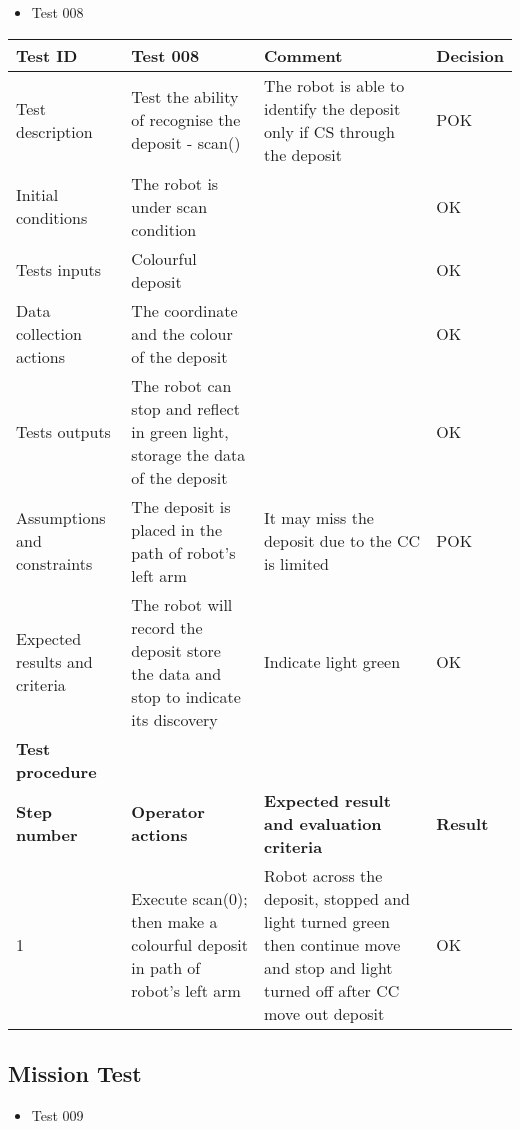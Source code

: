 \documentclass[11pt, a4paper]{article}
\begin{document}
\begin{itemize}
\item {Test 008}\\
\end{itemize}

\begin{tabular} 
	  {|p{4cm}|p{4.5cm}|p{4.5cm}|p{1.5cm}|}
\hline
\textbf{Test ID} & \textbf{Test 008} & \textbf{Comment} & \textbf{Decision}\\
\hline
{Test description} & {Test the ability of recognise the deposit - scan()} & {The robot is able to identify the deposit only if CS through the deposit} & {POK}\\
\hline
{Initial conditions} & {The robot is under scan \newline condition} & {} & {OK}\\
\hline
{Tests inputs} & {Colourful deposit} & {} & {OK}\\
\hline
{Data collection actions} & {The coordinate and the colour of the deposit} & {} & {OK}\\
\hline
{Tests outputs} & {The robot can stop and reflect in green light, storage the data of the deposit} & {} & {OK}\\
\hline
{Assumptions and constraints} & {The deposit is placed in the path of robot's left arm} & {It may miss the deposit due to the CC is limited} & {POK}\\
\hline
{Expected results and criteria} & {The robot will record the \newline deposit store the data and stop to indicate its discovery} & {Indicate light green} & {OK}\\
\hline
\textbf{Test procedure} & \textbf{} & \textbf{} & \textbf{}\\
\hline
\textbf{Step number} & \textbf{Operator actions} & \textbf{Expected result and \newline evaluation criteria} & \textbf{Result}\\
\hline
{1} & {Execute \newline scan(0); \newline then make a colourful deposit in path of robot's left arm} & {Robot across the deposit, stopped and light turned green then continue move and stop and light turned off after CC move out deposit} & {OK}\\
\hline
\end{tabular}
\newpage

\subsection{Mission Test}
\begin{itemize}
\item {Test 009}\\
\end{itemize}
\end{document}

